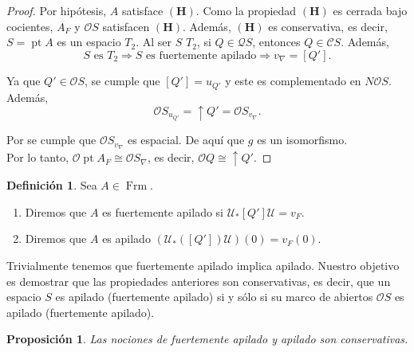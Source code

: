\documentclass[11pt]{amsart}
\DeclareMathOperator{\pt}{pt}
\DeclareMathOperator{\Frm}{Frm}
\theoremstyle{plain}
\newtheorem{prop}[thm]{Proposición}
\theoremstyle{definition}
\newtheorem{dfn}[thm]{Definición}
\begin{document}
\begin{proof}
Por hipótesis, $A$ satisface $\mathbf{(H)}$. Como la propiedad $\mathbf{(H)}$ es cerrada bajo cocientes, $A_F$ y $\mathcal{O}S$ satisfacen $\mathbf{(H)}$.
Además, $\mathbf{(H)}$ es conservativa, es decir, $S=\pt A$ es un espacio $T_2$. Al ser $S$ $T_2$, si $Q\in \mathcal{Q}S$, entonces $Q\in \mathcal{C}S$. Además,
\[
S \text{ es }T_2\Rightarrow S \text{ es fuertemente apilado}\Rightarrow v_\nabla=[Q'].
\]

Ya que $Q'\in \mathcal{O}S$, se cumple que $[Q']=u_{Q'}$ y este es complementado en $N\mathcal{O}S$. Además,
\[
\mathcal{O}S_{u_{Q'}}=\uparrow Q'=\mathcal{O}S_{v_\nabla}.
\]

Por \cite[Propocisión VI.3.3]{PicadoPultr} se cumple que $\mathcal{O}S_{v_\nabla}$ es espacial. De aquí que $g$ es un isomorfismo.\\

Por lo tanto, $\mathcal{O}\pt A_F\cong \mathcal{O}S_\nabla$, es decir, $\mathcal{O}Q\cong \uparrow Q'$.

\end{proof}

\begin{dfn}\label{def:apilado-marcos}
Sea $A\in \Frm$.
\begin{enumerate}
  \item Diremos que $A$ es fuertemente apilado si $\mathcal{U}_*[Q']\mathcal{U}=v_F$.
  \item Diremos que $A$ es apilado $(\mathcal{U}_*([Q'])\mathcal{U})(0)=v_F(0)$.
\end{enumerate}
\end{dfn}

Trivialmente tenemos que fuertemente apilado implica apilado. Nuestro objetivo 
es demostrar que las propiedades anteriores son conservativas, es decir, que un espacio $S$ es 
apilado (fuertemente apilado) si y sólo si su marco de abiertos $\mathcal{O}S$ es apilado (fuertemente apilado). 

\begin{prop}\label{apiladoconservativa}
Las nociones de fuertemente apilado y apilado son conservativas.
\end{prop}
\end{document}
